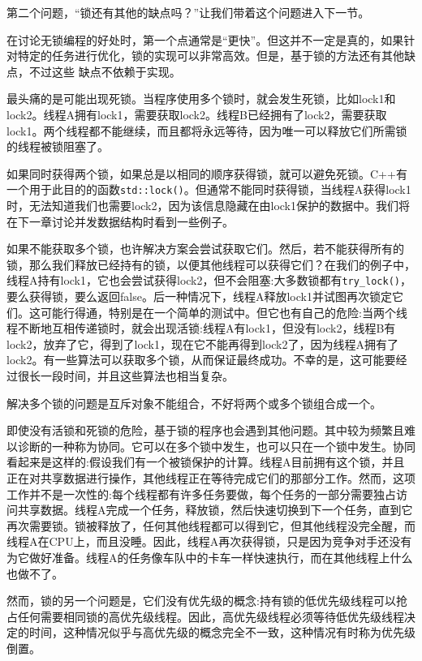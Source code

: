 第二个问题，“锁还有其他的缺点吗？”让我们带着这个问题进入下一节。


在讨论无锁编程的好处时，第一个点通常是“更快”。但这并不一定是真的，如果针对特定的任务进行优化，锁的实现可以非常高效。但是，基于锁的方法还有其他缺点，不过这些	缺点不依赖于实现。

最头痛的是可能出现死锁。当程序使用多个锁时，就会发生死锁，比如lock1和lock2。线程A拥有lock1，需要获取lock2。线程B已经拥有了lock2，需要获取lock1。两个线程都不能继续，而且都将永远等待，因为唯一可以释放它们所需锁的线程被锁阻塞了。

如果同时获得两个锁，如果总是以相同的顺序获得锁，就可以避免死锁。C++有一个用于此目的的函数\texttt{std::lock()}。但通常不能同时获得锁，当线程A获得lock1时，无法知道我们也需要lock2，因为该信息隐藏在由lock1保护的数据中。我们将在下一章讨论并发数据结构时看到一些例子。

如果不能获取多个锁，也许解决方案会尝试获取它们。然后，若不能获得所有的锁，那么我们释放已经持有的锁，以便其他线程可以获得它们？在我们的例子中，线程A持有lock1，它也会尝试获得lock2，但不会阻塞:大多数锁都有\texttt{try\_lock()}，要么获得锁，要么返回false。后一种情况下，线程A释放lock1并试图再次锁定它们。这可能行得通，特别是在一个简单的测试中。但它也有自己的危险:当两个线程不断地互相传递锁时，就会出现活锁:线程A有lock1，但没有lock2，线程B有lock2，放弃了它，得到了lock1，现在它不能再得到lock2了，因为线程A拥有了lock2。有一些算法可以获取多个锁，从而保证最终成功。不幸的是，这可能要经过很长一段时间，并且这些算法也相当复杂。

解决多个锁的问题是互斥对象不能组合，不好将两个或多个锁组合成一个。

即使没有活锁和死锁的危险，基于锁的程序也会遇到其他问题。其中较为频繁且难以诊断的一种称为协同。它可以在多个锁中发生，也可以只在一个锁中发生。协同看起来是这样的:假设我们有一个被锁保护的计算。线程A目前拥有这个锁，并且正在对共享数据进行操作，其他线程正在等待完成它们的那部分工作。然而，这项工作并不是一次性的:每个线程都有许多任务要做，每个任务的一部分需要独占访问共享数据。线程A完成一个任务，释放锁，然后快速切换到下一个任务，直到它再次需要锁。锁被释放了，任何其他线程都可以得到它，但其他线程没完全醒，而线程A在CPU上，而且没睡。因此，线程A再次获得锁，只是因为竞争对手还没有为它做好准备。线程A的任务像车队中的卡车一样快速执行，而在其他线程上什么也做不了。

然而，锁的另一个问题是，它们没有优先级的概念:持有锁的低优先级线程可以抢占任何需要相同锁的高优先级线程。因此，高优先级线程必须等待低优先级线程决定的时间，这种情况似乎与高优先级的概念完全不一致，这种情况有时称为优先级倒置。

